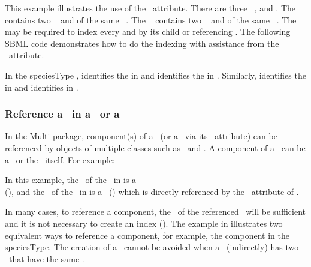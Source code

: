 This example illustrates the use of the \identifyingParentAtt\ attribute. There are three \speciesTypes\ ,  and . The \speciesType\  contains two \speciesTypeInstances\  and  of the same \speciesType\ . The \speciesType\  contains two \speciesTypeInstances\  and  of the same \speciesType\ . The \speciesType\  may be required to index every  and  by its \ListOfInSpeciesTypeBonds child or referencing \species. The following SBML code demonstrates how to do the indexing with assistance from the \identifyingParentAtt\ attribute.  


In the speciesType ,  identifies the  in  and  identifies the  in . Similarly,  identifies the  in  and  identifies  in .

\subsubsection{Reference a \component\ in a \speciesType\ or a \species}
\label{def:SpeciesType:component}

In the Multi package, component(s) of a \speciesType\ (or a \species\ via its \speciesType\ attribute) can be referenced by objects of multiple classes such as \OutwardBindingSite\ and \SpeciesFeature. A component of a \speciesType\ can be a \speciesTypeInstance\ or the \speciesType\ itself. For example:


In this example, the \componentAtt\ of the \outwardBindingSite\ in \species {} is a \speciesTypeInstance\\ (), and the \componentAtt\ of the \outwardBindingSite\ in \species {} is a \speciesType\ () which is directly referenced by the \speciesType\ attribute of .  

In many cases, to reference a component,  the \idAtt\ of the \mBlockChangedBegin{\revTwentyTwentyMarch}referenced\mBlockChangedEnd{\revTwentyTwentyMarch} \component\ will be sufficient and it is not necessary to create an index (\speciesTypeComponentIndex). The example in  illustrates two equivalent ways to reference a component, for example, the  component in the  speciesType. The creation of a \speciesTypeComponentIndex\ cannot be avoided when a \speciesType\ (indirectly) has two \speciesTypeInstances\ that have the same \idAtt.


